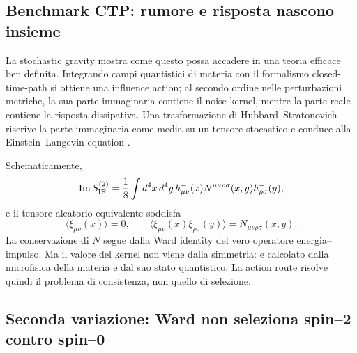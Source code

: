 \documentclass[11pt,a4paper]{article}
\begin{document}
\subsection{Benchmark CTP: rumore e risposta nascono insieme}

La stochastic gravity mostra come questo possa accadere in una teoria efficace ben definita. Integrando campi quantistici di materia con il formalismo closed-time-path si ottiene una influence action; al secondo ordine nelle perturbazioni metriche, la sua parte immaginaria contiene il noise kernel, mentre la parte reale contiene la risposta dissipativa. Una trasformazione di Hubbard--Stratonovich riscrive la parte immaginaria come media su un tensore stocastico e conduce alla Einstein--Langevin equation \cite{HuMatacz1995,HuVerdaguer2008}.

Schematicamente,
\begin{equation}
 \operatorname{Im}S_{\rm IF}^{(2)}
 =\frac18\int d^4x\,d^4y\,
 h^-_{\mu\nu}(x)
 N^{\mu\nu\rho\sigma}(x,y)
 h^-_{\rho\sigma}(y),
 \label{eq:r12j_imag_if}
\end{equation}
e il tensore aleatorio equivalente soddisfa
\begin{equation}
 \langle\xi_{\mu\nu}(x)\rangle=0,
 \qquad
 \langle\xi_{\mu\nu}(x)\xi_{\rho\sigma}(y)\rangle=N_{\mu\nu\rho\sigma}(x,y).
\end{equation}
La conservazione di $N$ segue dalla Ward identity del vero operatore energia--impulso. Ma il valore del kernel non viene dalla simmetria: e calcolato dalla microfisica della materia e dal suo stato quantistico. La action route risolve quindi il problema di consistenza, non quello di selezione.

\subsection{Seconda variazione: Ward non seleziona spin--2 contro spin--0}
\end{document}

